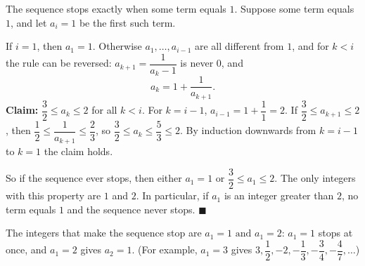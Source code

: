 The sequence stops exactly when some term equals $1$. Suppose some term equals $1$, and let $a_i=1$ be the first such term.

If $i=1$, then $a_1=1$. Otherwise $a_1,\dots,a_{i-1}$ are all different from $1$, and for $k<i$ the rule can be reversed: $a_{k+1}=\dfrac{1}{a_k-1}$ is never $0$, and
\[a_k=1+\dfrac{1}{a_{k+1}}.\]
\textbf{Claim:} $\dfrac32\le a_k\le2$ for all $k<i$. For $k=i-1$, $a_{i-1}=1+\dfrac11=2$. If $\dfrac32\le a_{k+1}\le2$, then $\dfrac12\le\dfrac{1}{a_{k+1}}\le\dfrac23$, so $\dfrac32\le a_k\le\dfrac53\le2$. By induction downwards from $k=i-1$ to $k=1$ the claim holds.

So if the sequence ever stops, then either $a_1=1$ or $\dfrac32\le a_1\le2$. The only integers with this property are $1$ and $2$. In particular, if $a_1$ is an integer greater than $2$, no term equals $1$ and the sequence never stops. $\blacksquare$

The integers that make the sequence stop are $\boxed{a_1=1\text{ and }a_1=2}$: $a_1=1$ stops at once, and $a_1=2$ gives $a_2=1$. (For example, $a_1=3$ gives $3,\dfrac12,-2,-\dfrac13,-\dfrac34,-\dfrac47,\dots$)
